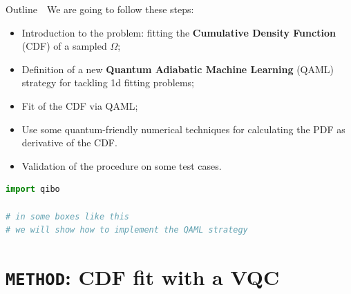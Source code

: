 \documentclass[8pt, xcolor={svgnames}, hyperref={colorlinks, linkcolor=black, citecolor=amethyst, urlcolor=amethyst}]{beamer}
\begin{document}
\begin{frame}[fragile]{Outline}
\large
\faArrowCircleRight\,\, We are going to follow these steps:
\pause
\begin{itemize}[noitemsep]
    \item[\faBatteryEmpty] Introduction to the problem: fitting the \textbf{Cumulative 
    Density Function} (CDF) of a sampled $\Omega$;
    \pause 
    \item[\faBatteryQuarter] Definition of a new \textbf{Quantum Adiabatic Machine Learning} 
    (QAML) strategy for tackling 1d fitting problems;
    \pause
    \item[\faBatteryHalf] Fit of the CDF via QAML;
    \pause
    \item[\faBatteryThreeQuarters] Use some quantum-friendly numerical techniques for calculating 
    the PDF as derivative of the CDF. 
    \pause
    \item[\faBatteryFull] Validation of the procedure on some test cases. 
    \pause
\end{itemize}
\vspace{0.3cm}
\begin{tcolorbox}
\begin{lstlisting}[language=Python, title=\textcolor{amethyst}{\faGithub\,\, Code here: \href{https://github.com/qiboteam/adiabatic-fit}{\texttt{qiboteam/adiabatic-fit}}}]
import qibo

# in some boxes like this
# we will show how to implement the QAML strategy
\end{lstlisting}
\end{tcolorbox}
\end{frame}

\section{\texttt{METHOD}: CDF fit with a VQC}
\end{document}
